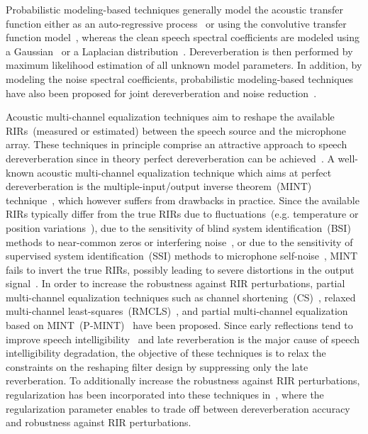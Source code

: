 \documentclass[draftcls,onecolumn,11pt]{IEEEtran}
\begin{document}
Probabilistic modeling-based techniques generally model the acoustic transfer function either as an auto-regressive process~\cite{Nakatani_ITASLP_2010,Jukic_ICASSP_2014} or using the convolutive transfer function model~\cite{Schwartz_ITASLP_2015}, whereas the clean speech spectral coefficients are modeled using a Gaussian~\cite{Nakatani_ITASLP_2010} or a Laplacian distribution~\cite{Jukic_ICASSP_2014}.
Dereverberation is then performed by maximum likelihood estimation of all unknown model parameters. 
In addition, by modeling the noise spectral coefficients, probabilistic modeling-based techniques have also been proposed for joint dereverberation and noise reduction~\cite{Yoshioka_ITASLP_2009,Ito_ICASSP_2014}.

Acoustic multi-channel equalization techniques aim to reshape the available RIRs~(measured or estimated) between the speech source and the microphone array. 
These techniques in principle comprise an attractive approach to speech dereverberation since in theory perfect dereverberation can be achieved~\cite{Miyoshi_ITASS_1988,Hacihabibouglu_ITASLP_2012}.
A well-known acoustic multi-channel equalization technique which aims at perfect dereverberation is the multiple-input/output inverse theorem~(MINT) technique~\cite{Miyoshi_ITASS_1988}, which however suffers from drawbacks in practice. 
Since the available RIRs typically differ from the true RIRs due to fluctuations~(e.g. temperature or position variations~\cite{Radlovic_ITSA_2000}), due to the sensitivity of blind system identification~(BSI) methods to near-common zeros or interfering noise~\cite{Haque_SPL_2008,Lin_ITASLP_2012,Lim_IWAENC_2014}, or due to the sensitivity of supervised system identification~(SSI) methods to microphone self-noise~\cite{Lim_ITASLP_2014}, MINT fails to invert the true RIRs, possibly leading to severe distortions in the output signal~\cite{Kodrasi_ITASLP_2013,Lim_ITASLP_2014}.
In order to increase the robustness against RIR perturbations, partial multi-channel equalization techniques such as channel shortening~(CS)~\cite{Kallinger_ICASSP_2006}, relaxed multi-channel least-squares~(RMCLS)~\cite{Lim_ITASLP_2014}, and partial multi-channel equalization based on MINT~(P-MINT)~\cite{Kodrasi_ITASLP_2013} have been proposed. 
Since early reflections tend to improve speech intelligibility~\cite{Arweiler_JASA_2011} and late reverberation is the major cause of speech intelligibility degradation, the objective of these techniques is to relax the constraints on the reshaping filter design by suppressing only the late reverberation.
To additionally increase the robustness against RIR perturbations, regularization has been incorporated into these techniques in~\cite{Kodrasi_ITASLP_2013}, where the regularization parameter enables to trade off between dereverberation accuracy and robustness against RIR perturbations.
\end{document}

